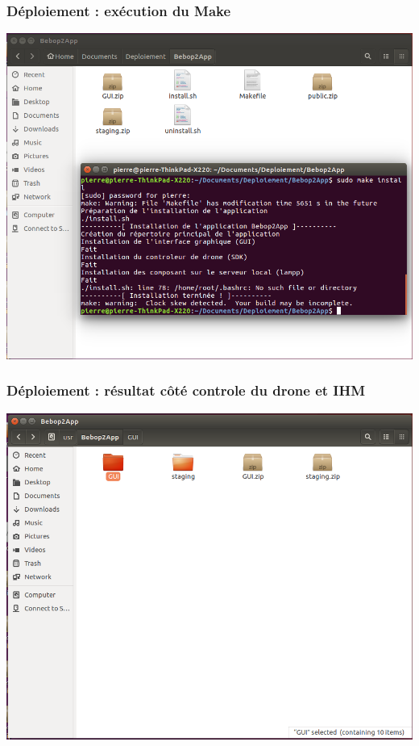 \documentclass{beamer}
\begin{document}
	
	\begin{frame}
		\begin{center}
		\frametitle{Déploiement : exécution du Make}
        \includegraphics[scale=0.3]{result_deploiment_2.png}
		\end{center}
	\end{frame}

	
	\begin{frame}
		\begin{center}
		\frametitle{Déploiement : résultat côté controle du drone et IHM}
        \includegraphics[scale=0.3]{result_deploiment_3.png}
		\end{center}
	\end{frame}
\end{document}
